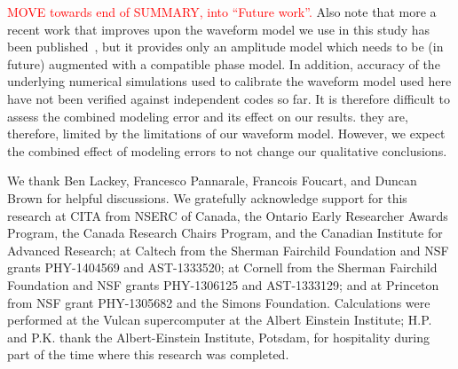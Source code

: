 \documentclass[aps,prd,amsmath,floats,floatfix, twocolumn,
superscriptaddress,nofootinbib,showpacs]{revtex4-1}
\newcommand{\red}{\textcolor{red}}
\newcommand{\prayush}{\textcolor{red!40!black}}
\begin{document}
\red{
MOVE towards end of SUMMARY, into ``Future work''.
}
\prayush{
Also note
that more a recent work that improves upon the waveform model we use in this
study has been published~\cite{Pannarale:2015jka}, but it provides only an 
amplitude model which needs to be (in future) augmented with a compatible
phase model. In addition, accuracy of the underlying numerical simulations 
used to calibrate the waveform model used here have not been verified against 
independent codes so far.
It is therefore difficult to assess the combined modeling error and its effect
on our results. they are, therefore, limited by the limitations of our
waveform model. However, we expect the combined effect of modeling errors to
not change our qualitative conclusions.
}


\begin{acknowledgments}
We thank Ben Lackey, Francesco Pannarale, Francois Foucart, and Duncan Brown
    for helpful discussions. We gratefully acknowledge support
  for this research at CITA from NSERC of Canada, the Ontario Early 
  Researcher Awards Program, the Canada Research
  Chairs Program, and the Canadian Institute for Advanced Research; at
  Caltech from the Sherman Fairchild Foundation and NSF grants
  PHY-1404569 and AST-1333520; at Cornell from the
  Sherman Fairchild Foundation and NSF grants PHY-1306125 and
  AST-1333129; and at Princeton from NSF grant PHY-1305682 and the
  Simons Foundation.  Calculations were performed at the Vulcan
  supercomputer at the Albert Einstein Institute;
  H.P. and P.K. thank the Albert-Einstein Institute,
  Potsdam, for hospitality during part of the time where this research
  was completed.
\end{acknowledgments}
\end{document}
